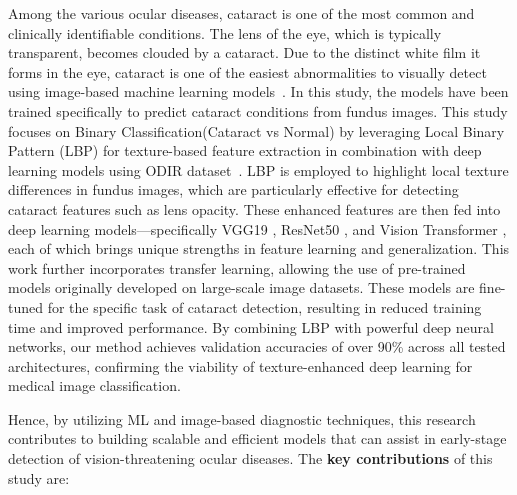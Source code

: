 \documentclass{ijclclp}
\begin{document}
Among the various ocular diseases, cataract is one of the most common and clinically identifiable conditions. The lens of the eye, which is typically transparent, becomes clouded by a cataract. Due to the distinct white film it forms in the eye, cataract is one of the easiest abnormalities to visually detect using image-based machine learning models~\cite{weni2021cataract}. In this study, the models have been trained specifically to predict cataract conditions from fundus images. This study focuses on Binary Classification(Cataract vs Normal) by leveraging Local Binary Pattern (LBP) for texture-based feature extraction in combination with deep learning models using ODIR dataset~\cite{odir5k}. 
LBP is employed to highlight local texture differences in fundus images, which are particularly effective for detecting cataract features such as lens opacity. These enhanced features are then fed into deep learning models—specifically VGG19 \cite{vggmedium,hu2024}, ResNet50 \cite{resnet50medium,resnet}, and Vision Transformer \cite{xu2023automatic,vitmedium}, each of which brings unique strengths in feature learning and generalization. This work further incorporates transfer learning, allowing the use of pre-trained models originally developed on large-scale image datasets. These models are fine-tuned for the specific task of cataract detection, resulting in reduced training time and improved performance. By combining LBP with powerful deep neural networks, our method achieves validation accuracies of over 90\% across all tested architectures, confirming the viability of texture-enhanced deep learning for medical image classification.


Hence, by utilizing ML and image-based diagnostic techniques, this research contributes to building scalable and efficient models that can assist in early-stage detection of vision-threatening ocular diseases. The \textbf{key contributions} of this study are:
\end{document}
